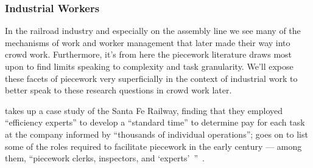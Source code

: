\documentclass[trackingWork]{subfiles}
\begin{document}
\begin{comment}
What did I pull from the threads that are related to industrial and railroad workers (i.e. 1920 onward?)

- Graves: railway companies used ``efficiency experts'' to study how long tasks should take
- Hart: evaluation limits complexity (we can affect that with peer evaluation!)
- Graves: sparks of Scientific Management in Piecework
- organization types are important determinants of piecework viability: lots of types of tasks? bad
  - Hart (I think?): variability in *worker* quality is fine
- Foreman is important
- Worker advocacy groups arose to speak out against piecework

\end{comment}

\subsubsection{Industrial Workers}
In the railroad industry and especially on the assembly line
we see many of the mechanisms of work and worker management that later made their way into crowd work.
Furthermore, it's from here the piecework literature draws most upon to find limits speaking to complexity and task granularity.
We'll expose these facets of piecework very superficially in the context of industrial work
to better speak to these research questions in crowd work later.

\citeauthor{10.2307/23702539} takes up a case study of the Santa Fe Railway,
finding that they employed ``efficiency experts'' to develop a ``standard time''
to determine pay for each task at the company informed by
``thousands of individual operations''; %
\citeauthor{10.2307/23702539} goes on to list
some of the roles required to facilitate piecework
in the early  century
--- among them, ``piecework clerks, inspectors, and `experts'~''~\cite{10.2307/23702539}.
\end{document}
